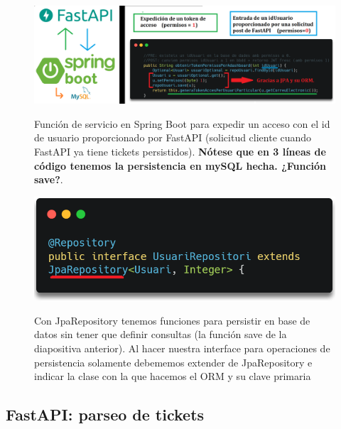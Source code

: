 \documentclass{beamer}
\begin{document}
	
	
	
	\begin{frame}
		\begin{figure}
			\centering
			\includegraphics[width=1\linewidth]{imgEspecifiques/diaposolicitudTokenAccesFastAPI.png}
			\label{fig:diaposolicitudTokenAccesFastAPI}
			\caption{Función de servicio en Spring Boot para expedir un acceso con el id de usuario proporcionado por FastAPI (solicitud cliente cuando FastAPI ya tiene tickets persistidos). \textbf{Nótese que en 3 líneas de código tenemos la persistencia en mySQL hecha. ¿Función save?}.}
		\end{figure}
	\end{frame}
		
	

	
	\begin{frame}
		\begin{figure}
			\centering
			\includegraphics[width=1\linewidth]{imgEspecifiques/JPAexplicacioSaveRepoUsuari.png}
			\label{fig:JPAexplicacioSaveRepoUsuari}
			\caption{Con JpaRepository tenemos funciones para persistir en base de datos sin tener que definir consultas (la función save de la diapositiva anterior). Al hacer nuestra interface para operaciones de persistencia solamente debememos extender de JpaRepository e indicar la clase con la que hacemos el ORM y su clave primaria}
		\end{figure}
	\end{frame}
	
	
	
	
	\subsection{FastAPI: parseo de tickets}
	
\end{document}
